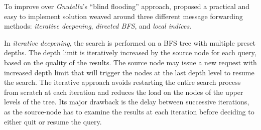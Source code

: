 To improve over {\sl Gnutella}'s ``blind flooding'' approach,
\cite{YG-M2002} proposed a practical and easy to implement solution 
weaved around three different message forwarding methods:
\emph{iterative deepening},
\emph{directed BFS}, and \emph{local indices}.

In \emph{iterative deepening}, 
the search is
performed on a BFS tree with multiple preset depths. 
The depth limit is iteratively increased by the source node for each query, 
based on the quality of the results. 
The source node may issue a new request with increased depth limit
that will trigger the nodes at the last depth level to resume the search. 
The iterative approach avoids restarting the entire search process 
from scratch at each iteration and reduces the load on the nodes of 
the upper levels of the tree. 
Its major drawback is the delay between successive iterations, as the
source-node has to examine the results at each iteration before deciding to
either quit or resume the query.

